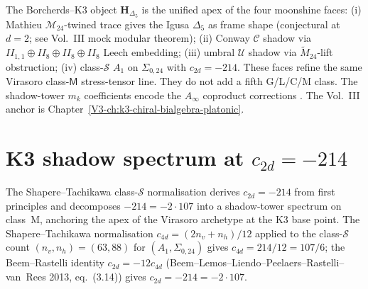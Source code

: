 \begin{remark}
\label{rem:stqp-2}
The Borcherds--K3 object $\mathbf H_{\Delta_5}$ is the unified apex
of the four moonshine faces: (i) Mathieu $\mathcal M_{24}$-twined
trace gives the Igusa $\Delta_5$ as frame shape (conjectural at
$d=2$; see Vol.~III mock modular theorem); (ii) Conway $\mathcal C$
shadow via $II_{1,1}\oplus II_{8}\oplus II_{8}\oplus II_{8}$ Leech
embedding; (iii) umbral $\mathcal U$ shadow via
$\widetilde M_{24}$-lift obstruction; (iv) class-$\mathcal S$
$A_1$ on $\Sigma_{0,24}$ with $c_{2d} = -214$. These faces refine the
same Virasoro class-$\mathsf M$ stress-tensor line. They do not add a
fifth G/L/C/M class. The shadow-tower $m_k$ coefficients encode the
$A_\infty$ coproduct corrections
\cite{ConwaySloane1988,ChengDuncanHarvey2014,Gaiotto2009}. The
Vol.~III anchor is Chapter~\ref{V3-ch:k3-chiral-bialgebra-platonic}.
\end{remark}

\section{K3 shadow spectrum at $c_{2d} = -214$}
\label{sec:stqp-supplement-ii}

The Shapere--Tachikawa class-$\mathcal S$ normalisation
derives $c_{2d} = -214$ from first principles and decomposes
$-214 = -2\cdot 107$ into a shadow-tower spectrum on class~$\mathrm M$,
anchoring the apex of the Virasoro archetype at the K3 base point.
The Shapere--Tachikawa normalisation $c_{4d} = (2n_v + n_h)/12$
applied to the class-$\mathcal S$ count $(n_v, n_h) = (63, 88)$
for $(A_1, \Sigma_{0,24})$ gives $c_{4d} = 214/12 = 107/6$; the
Beem--Rastelli identity $c_{2d} = -12c_{4d}$
(Beem--Lemos--Liendo--Peelaers--Rastelli--van~Rees 2013, eq.~(3.14))
gives $c_{2d} = -214 = -2\cdot 107$.

